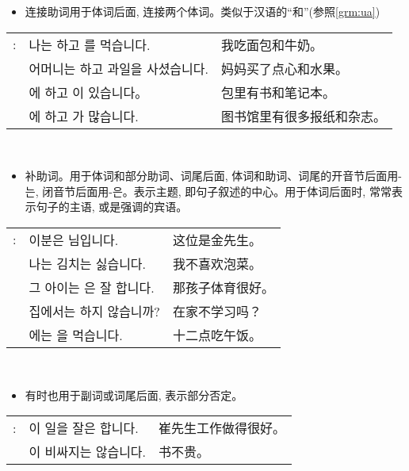 \begin{grammar}
	\begin{grammarsect}[\kr -하고]\label{grm:hako}
		\begin{itemize}
			\item 连接助词用于体词后面, 连接两个体词。类似于汉语的“和”(参照\ref{grm:ua})
		\end{itemize}
		\begin{tabular}{lll}
			\kr \ruby{例}{예}: & \kr 나는 \ruby{빵}{pão}하고 \ruby{牛乳}{우유}를 먹습니다.               & 我吃面包和牛奶。      \\
			                 & \kr 어머니는 \ruby{菓子}{과자}하고 과일을 사셨습니다.                       & 妈妈买了点心和水果。    \\
			                 & \kr \ruby{가방}{かばん}에 \ruby{冊}{책}하고 \ruby{空冊}{공책}이 있습니다。    & 包里有书和笔记本。     \\
			                 & \kr \ruby{圖書館}{도서관}에 \ruby{新聞}{신문}하고 \ruby{雜誌}{잡지}가 많습니다. & 图书馆里有很多报纸和杂志。 \\
		\end{tabular}\\
	\end{grammarsect}
	\begin{grammarsect}[\kr -은 / -는]
		\begin{itemize}
			\item 补助词。用于体词和部分助词、词尾后面, 体词和助词、词尾的开音节后面用{\kr -는}, 闭音节后面用{\kr -은}。表示主题, 即句子叙述的中心。用于体词后面时, 常常表示句子的主语, 或是强调的宾语。
		\end{itemize}
		\begin{tabular}{lll}
			\kr \ruby{例}{예}: & \kr 이분은 \ruby{金}{김} \ruby{先生}{선생}님입니다.                & 这位是金先生。  \\
			                 & \kr 나는 김치는 싫습니다.                                      & 我不喜欢泡菜。  \\
			                 & \kr 그 아이는 \ruby{運動}{운동}은 잘 합니다.                       & 那孩子体育很好。 \\
			                 & \kr 집에서는 \ruby{工夫}{공부}하지 않습니까?                        & 在家不学习吗？  \\
			                 & \kr \ruby{ / 2}{열두}\ruby{時}{시}에는 \ruby{點心}{점심}을 먹습니다. & 十二点吃午饭。
		\end{tabular}\\
		\begin{itemize}
			\item 有时也用于副词或词尾后面, 表示部分否定。
		\end{itemize}
		\begin{tabular}{lll}
			\kr \ruby{例}{예}: & \kr \ruby{崔}{최} \ruby{先生}{선생}이 일을 잘은 합니다. & 崔先生工作做得很好。 \\
			                 & \kr \ruby{冊}{책}이 비싸지는 않습니다.               & 书不贵。
		\end{tabular}\\
	\end{grammarsect}
\end{grammar}
